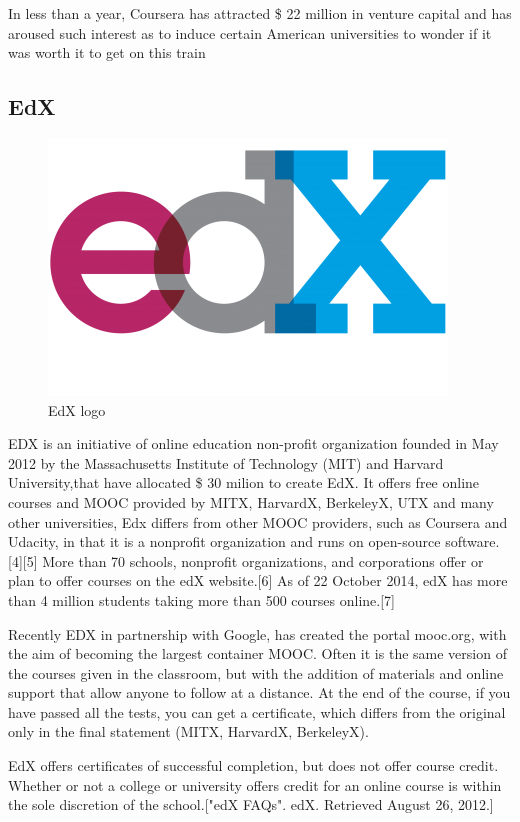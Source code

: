 In less than a year, Coursera has attracted \$ 22 million in venture capital and has aroused such interest as to induce certain American universities to wonder if it was worth it to get on this train

\subsection{EdX}
\label{subsec:EdX}
\begin{figure}[htb] %
 \centering
 \includegraphics[width=0.5\linewidth]{images/chapter1/edx_logo.png}\hfill
 \caption[EdX logo]{EdX logo}
 \label{fig:fourV}
\end{figure}

EDX is an initiative of online education non-profit organization founded in May 2012 by the Massachusetts Institute of Technology (MIT) and Harvard University,that have allocated \$ 30 milion to create EdX.
It offers free online courses and MOOC provided by MITX, HarvardX, BerkeleyX, UTX and many other universities, Edx differs from other MOOC providers, such as Coursera and Udacity, in that it is a nonprofit organization and runs on open-source software.[4][5]
More than 70 schools, nonprofit organizations, and corporations offer or plan to offer courses on the edX website.[6] 
As of 22 October 2014, edX has more than 4 million students taking more than 500 courses online.[7]

Recently EDX in partnership with Google, has created the portal mooc.org, with the aim of becoming the largest container MOOC.
Often it is the same version of the courses given in the classroom, but with the addition of materials and online support that allow anyone to follow at a distance. At the end of the course, if you have passed all the tests, you can get a certificate, which differs from the original only in the final statement (MITX, HarvardX, BerkeleyX).


EdX offers certificates of successful completion, but does not offer course credit. Whether or not a college or university offers credit for an online course is within the sole discretion of the school.["edX FAQs". edX. Retrieved August 26, 2012.]

